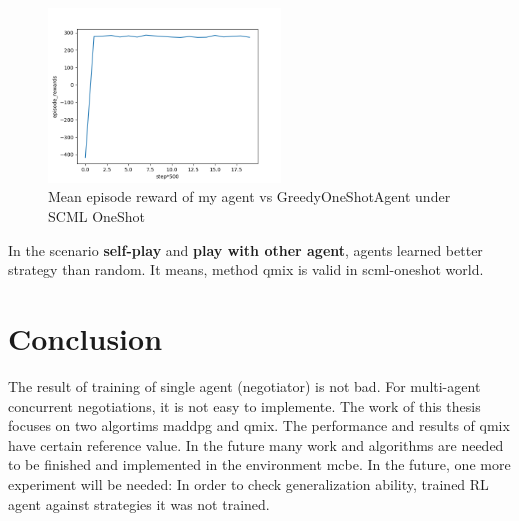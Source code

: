 \begin{figure}[htbp]
\centering
\includegraphics[width=0.55\textwidth]{./images/oneshot_my_vs_greedy.png}
\caption{Mean episode reward of my agent vs GreedyOneShotAgent under SCML OneShot}
\label{fig:oneshot-my-vs-greedy}
\end{figure}

In the scenario \textbf{self-play} and \textbf{play with other agent}, agents learned better strategy than random. It means, method \gls{qmix} is valid in scml-oneshot world.

\section{Conclusion}
The result of training of single agent (negotiator) is not bad. For multi-agent concurrent negotiations, it is not easy to implemente. The work of this thesis focuses on two algortims \gls{maddpg} and \gls{qmix}. The performance and results of \gls{qmix} have certain reference value. In the future many work and algorithms are needed to be finished and implemented in the environment \gls{mcbe}. In the future, one more experiment will be needed: In order to check generalization ability, trained RL agent against strategies it was not trained.